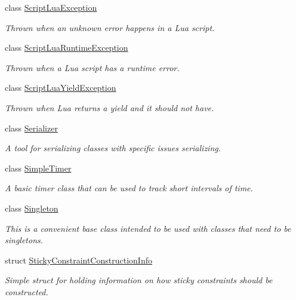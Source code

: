 \begin{DoxyCompactItemize}
class \hyperlink{classMezzanine_1_1ScriptLuaException}{Script\-Lua\-Exception}
\begin{DoxyCompactList}\small\item\em Thrown when an unknown error happens in a Lua script. \end{DoxyCompactList}\item 
class \hyperlink{classMezzanine_1_1ScriptLuaRuntimeException}{Script\-Lua\-Runtime\-Exception}
\begin{DoxyCompactList}\small\item\em Thrown when a Lua script has a runtime error. \end{DoxyCompactList}\item 
class \hyperlink{classMezzanine_1_1ScriptLuaYieldException}{Script\-Lua\-Yield\-Exception}
\begin{DoxyCompactList}\small\item\em Thrown when Lua returns a yield and it should not have. \end{DoxyCompactList}\item 
class \hyperlink{classMezzanine_1_1Serializer}{Serializer}
\begin{DoxyCompactList}\small\item\em A tool for serializing classes with specific issues serializing. \end{DoxyCompactList}\item 
class \hyperlink{classMezzanine_1_1SimpleTimer}{Simple\-Timer}
\begin{DoxyCompactList}\small\item\em A basic timer class that can be used to track short intervals of time. \end{DoxyCompactList}\item 
class \hyperlink{classMezzanine_1_1Singleton}{Singleton}
\begin{DoxyCompactList}\small\item\em This is a convenient base class intended to be used with classes that need to be singletons. \end{DoxyCompactList}\item 
struct \hyperlink{structMezzanine_1_1StickyConstraintConstructionInfo}{Sticky\-Constraint\-Construction\-Info}
\begin{DoxyCompactList}\small\item\em Simple struct for holding information on how sticky constraints should be constructed. \end{DoxyCompactList}\item 

\end{DoxyCompactItemize}
